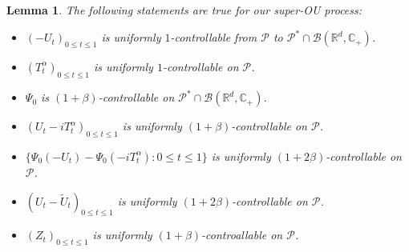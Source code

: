 \documentclass[12pt]{amsart}
\theoremstyle{plain}
\newtheorem{lem}[thm]{Lemma}
\theoremstyle{definition}
\numberwithin{equation}{section}
\begin{document}
\begin{lem}
\label{lem: upper bound for usgx}
The following statements are true for our super-OU process:
\begin{itemize}
\item[(1)]
   $(-U_t)_{0\leq t\leq 1}$ is uniformly $1$-controllable from $\mathcal P$ to $\mathcal P^*\cap \mathcal B(\mathbb R^d, \mathbb C_+)$.
\item[(2)]
    $(T^\alpha_t)_{0\leq t\leq 1}$ is uniformly $1$-controllable on $\mathcal P$.
\item[(3)]
    $\Psi_0$ is $(1+\beta)$-controllable on $\mathcal P^* \cap \mathcal B(\mathbb R^d, \mathbb C_+)$.
\item[(4)]
    $(U_t- iT_t^{\alpha})_{0\leq t\leq 1}$ is uniformly $(1+\beta)$-controllable on $\mathcal P$.
\item[(5)]
    $\{\Psi_0(-U_t) - \Psi_0(-iT_t^\alpha): 0\leq t\leq 1\}$ is uniformly $(1+2\beta)$-controllable on $\mathcal P$.
\item[(6)]
    $(U_t-\tilde U_t)_{0\leq t\leq 1}$ is uniformly $(1+2\beta)$-controllable on $\mathcal P$.
\item[(7)]
    $(Z_t)_{0\leq t\leq 1}$ is uniformly $(1+\beta)$-controallable on $\mathcal P$.
\end{itemize}
\end{lem}
\end{document}
